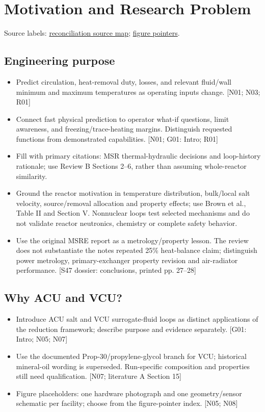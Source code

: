 \section{Motivation and Research Problem}
\noindent\small Source labels: \href{run:doc_support/reconciliation/2026-11-02/SOURCES.md}{reconciliation source map}; \href{run:doc_support/reconciliation/2026-11-02/FIGURE_POINTERS.md}{figure pointers}.\normalsize

\subsection{Engineering purpose}
\begin{itemize}[leftmargin=*]
\item Predict circulation, heat-removal duty, losses, and relevant fluid/wall minimum and maximum temperatures as operating inputs change. [N01; N03; R01]
\item Connect fast physical prediction to operator what-if questions, limit awareness, and freezing/trace-heating margins. Distinguish requested functions from demonstrated capabilities. [N01; G01: Intro; R01]
\item Fill with primary citations: MSR thermal-hydraulic decisions and loop-history rationale; use Review B Sections 2--6, rather than assuming whole-reactor similarity.
\item Ground the reactor motivation in temperature distribution, bulk/local salt velocity, source/removal allocation and property effects; use Brown et al., Table II and Section V. Nonnuclear loops test selected mechanisms and do not validate reactor neutronics, chemistry or complete safety behavior.\cite{brown2020msrphenomena}
\item Use the original MSRE report as a metrology/property lesson. The review does not substantiate the notes\textquotesingle{} repeated 25\% heat-balance claim; distinguish power metrology, primary-exchanger property revision and air-radiator performance. [S47 dossier: conclusions, printed pp. 27--28]\cite{gabbard1970msre}
\end{itemize}

\subsection{Why ACU and VCU?}
\begin{itemize}[leftmargin=*]
\item Introduce ACU salt and VCU surrogate-fluid loops as distinct applications of the reduction framework; describe purpose and evidence separately. [G01: Intro; N05; N07]
\item Use the documented Prop-30/propylene-glycol branch for VCU; historical mineral-oil wording is superseded. Run-specific composition and properties still need qualification. [N07; literature A Section 15]
\item Figure placeholders: one hardware photograph and one geometry/sensor schematic per facility; choose from the figure-pointer index. [N05; N08]
\end{itemize}

